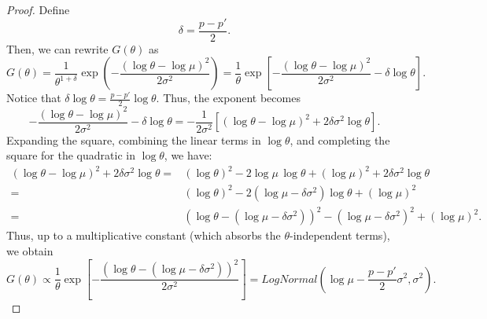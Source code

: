 \begin{proof}
Define
\[
\delta = \frac{p-p'}{2}.
\]
Then, we can rewrite \(G(\theta)\) as
\[
G(\theta) = \frac{1}{\theta^{1+\delta}}\exp\left(-\frac{(\log \theta - \log \mu)^2}{2\sigma^2}\right)
= \frac{1}{\theta}\exp\left[-\frac{(\log \theta - \log \mu)^2}{2\sigma^2} - \delta \log \theta\right].
\]
Notice that \(\delta \log \theta = \frac{p-p'}{2}\log \theta\). %
Thus, the exponent becomes
\[
-\frac{(\log \theta - \log \mu)^2}{2\sigma^2} - \delta \log \theta 
= -\frac{1}{2\sigma^2}\left[(\log \theta - \log \mu)^2 + 2\delta\sigma^2\log \theta\right].
\]
Expanding the square, combining the linear terms in \(\log \theta\), and completing the square for the quadratic in \(\log \theta\), we have: 
\begin{align*}
(\log \theta - \log \mu)^2 + 2\delta\sigma^2\log \theta 
= & (\log \theta)^2 - 2\log \mu\,\log \theta + (\log \mu)^2 + 2\delta\sigma^2\log \theta \\
= &(\log \theta)^2 - 2\left(\log \mu - \delta\sigma^2\right)\log \theta + (\log \mu)^2 \\
= & \left(\log \theta - \left(\log \mu - \delta\sigma^2\right)\right)^2 - \left(\log \mu - \delta\sigma^2\right)^2 + (\log \mu)^2.
\end{align*}
Thus, up to a multiplicative constant (which absorbs the \(\theta\)-independent terms), we obtain
\[
G(\theta) \propto \frac{1}{\theta}\exp\left[-\frac{\left(\log \theta - \left(\log \mu - \delta\sigma^2\right)\right)^2}{2\sigma^2}\right] = LogNormal\left(\log\mu - \frac{p-p'}{2}\sigma^2, \sigma^2\right).
\]
\end{proof}

